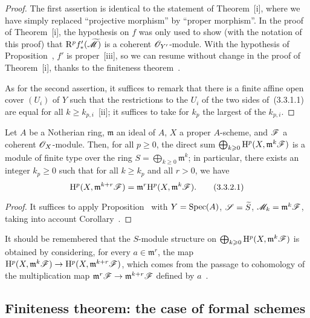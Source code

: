 \begin{proof}
The first assertion is identical to the statement of Theorem~[i], where we have simply replaced ``projective morphism'' by ``proper morphism''.
In the proof of Theorem~[i], the hypothesis on $f$ was only used to show (with the notation of this proof) that $\mathrm{R}^p f_*'(\widetilde{\mathscr{M}})$ is a coherent $\mathscr{O}_{Y'}$-module.
With the hypothesis of Proposition~, $f'$ is proper~[iii], so we can resume without change in the proof of Theorem~[i], thanks to the finiteness theorem~.

As for the second assertion, it suffices to remark that there is a finite affine open cover $(U_i)$ of $Y$ such that the restrictions to the $U_i$ of the two sides of~(3.3.1.1) are equal for all $k\geq k_{p,i}$~[ii]; it suffices to take for $k_p$ the largest of the $k_{p,i}$.
\end{proof}

\begin{corollary}[3.3.2]
\label{III.3.3.2}
Let $A$ be a Notherian ring, $\mathfrak{m}$ an ideal of $A$, $X$ a proper $A$-scheme, and $\mathscr{F}$ a coherent $\mathscr{O}_X$-module.
Then, for all $p\geq 0$, the direct sum $\bigoplus_{k\geqslant 0}\mathrm{H}^p(X,\mathfrak{m}^k\mathscr{F})$ is a module of finite type over the ring $S=\bigoplus_{k\geq 0}\mathfrak{m}^k$; in particular, there exists an integer $k_p\geq 0$ such that for all $k\geq k_p$ and all $r>0$, we have
\[
\label{III.3.3.2.1}
  \mathrm{H}^p(X,\mathfrak{m}^{k+r}\mathscr{F})=\mathfrak{m}^r\mathrm{H}^p(X,\mathfrak{m}^k\mathscr{F}).
  \tag{3.3.2.1}
\]
\end{corollary}

\begin{proof}
It suffices to apply Proposition~ with $Y=\operatorname{Spec}(A)$, $\mathscr{S}=\widetilde{S}$, $\mathscr{M}_k=\mathfrak{m}^k\mathscr{F}$, taking into account Corollary~.
\end{proof}

It should be remembered that the $S$-module structure on $\bigoplus_{k\geqslant 0}\mathrm{H}^p(X,\mathfrak{m}^k\mathscr{F})$ is obtained by considering, for every $a\in\mathfrak{m}^r$, the map $\HH^p(X,\mathfrak{m}^k\sh{F})\to\HH^p(X,\mathfrak{m}^{k+r}\sh{F})$, which comes from the passage to cohomology of the multiplication map $\mathfrak{m}^r\sh{F}\to\mathfrak{m}^{k+r}\sh{F}$ defined by $a$~.

\subsection{Finiteness theorem: the case of formal schemes}
\label{subsection:III.3.4}

